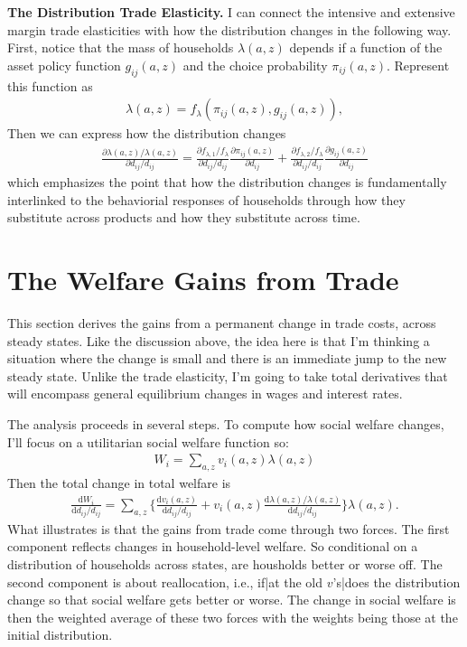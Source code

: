 \documentclass[12pt,pdftex]{article}
\begin{document}
\begin{onehalfspacing}
\textbf{The Distribution Trade Elasticity.} I can connect the intensive and extensive margin trade elasticities with how the distribution changes in the following way. First, notice that the mass of households $\lambda(a,z)$ depends if a function of the asset policy function $g_{ij}(a,z)$ and the choice probability $\pi_{ij}(a,z)$. Represent this function as
\begin{align}
\lambda(a,z) = f_{\lambda}(\pi_{ij}(a,z),g_{ij}(a,z)),
\end{align}
Then we can express how the distribution changes
\begin{align}
\frac{\partial \lambda(a,z)/\lambda(a,z)}{\partial d_{ij}/d_{ij}}  = \frac{\partial f_{\lambda, 1} / f_{\lambda} }{\partial d_{ij}/d_{ij}} \frac{\partial \pi_{ij}(a,z)}{\partial d_{ij}} +  
\frac{\partial f_{\lambda, 2} / f_{\lambda} }{\partial d_{ij}/d_{ij}} \frac{\partial g_{ij}(a,z)}{\partial d_{ij}} 
\label{eq:apx-distribution-margin}
\end{align}
which emphasizes the point that how the distribution changes is fundamentally interlinked to the behaviorial responses of households through how they substitute across products and how they substitute across time.

\section{The Welfare Gains from Trade}

This section derives the gains from a permanent change in trade costs, across steady states. Like the discussion above, the idea here is that I'm thinking a situation where the change is small and there is an immediate jump to the new steady state. Unlike the trade elasticity, I'm going to take total derivatives that will encompass general equilibrium changes in wages and interest rates.

The analysis proceeds in several steps. To compute how social welfare changes, I'll focus on a utilitarian social welfare function so:
\begin{align}
W_{i} = \sum_{a,z} v_{i}(a,z)\lambda(a,z)
\label{eq:apx-social-welfare}
\end{align}
Then the total change in total welfare is
\begin{align}
\frac{\mathrm{d} W_{i}}{\mathrm{d} d_{ij} / d_{ij}} = \sum_{a,z} \bigg \{ \frac{\mathrm{d} v_i(a, z)}{\mathrm{d} d_{ij} / d_{ij}}  + v_{i}(a,z) \frac{\mathrm{d} \lambda(a,z)/ \lambda(a,z)}{\mathrm{d} d_{ij} / d_{ij}}  \bigg \} \lambda(a,z).
\label{eq:apx-social-welfare-change}
\end{align}
What illustrates is that the gains from trade come through two forces. The first component reflects changes in household-level welfare. So conditional on a distribution of households across states, are housholds better or worse off. The second component is about reallocation, i.e., if|at the old $v$'s|does the distribution change so that social welfare gets better or worse. The change in social welfare is then the weighted average of these two forces with the weights being those at the initial distribution.


\end{onehalfspacing}
\end{document}
